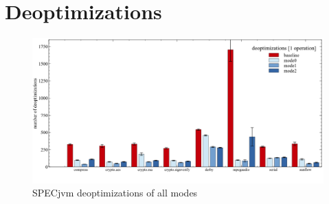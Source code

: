 %
%
%
%




\section{Deoptimizations}
\label{s:perf_deoptimizations}

\begin{figure}[ht]
  \begin{center}
    \centering
    \includegraphics[width=1.0\textwidth]{figures/others_warmup_deopt.png}
    \caption{SPECjvm deoptimizations of all modes}
    \label{f:others_warmup_deopt}
  \end{center}
\end{figure}

